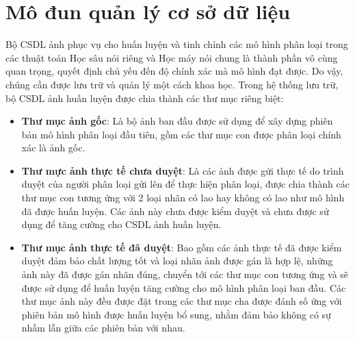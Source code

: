 \section{Mô đun quản lý cơ sở dữ liệu}
Bộ CSDL ảnh phục vụ cho huấn luyện và tinh chỉnh các mô hình phân loại trong các thuật toán Học sâu nói riêng và Học máy nói chung là thành phần vô cùng quan trọng, quyết định chủ yếu đến độ chính xác mà mô hình đạt được. Do vậy, chúng cần được lưu trữ và quản lý một cách khoa học. Trong hệ thống lưu trữ, bộ CSDL ảnh huấn luyện được chia thành các thư mục riêng biệt:
\begin{itemize}
	\item {\bf Thư mục ảnh gốc}: Là bộ ảnh ban đầu được sử dụng để xây dựng phiên bản mô hình phân loại đầu tiên, gồm các thư mục con được phân loại chính xác là ảnh gốc.
	\item {\bf Thư mực ảnh thực tế chưa duyệt}: Là các ảnh được gửi thực tế do trình duyệt của người phân loại gửi lên để thực hiện phân loại, được chia thành các thư mục con tương ứng với 2 loại nhãn có lao hay không có lao như mô hình đã được huấn luyện. Các ảnh này chưa được kiểm duyệt và chưa được sử dụng để tăng cường cho CSDL ảnh huấn luyện.
	\item {\bf Thư mục ảnh thực tế đã duyệt}: Bao gồm các ảnh thực tế đã được kiểm duyệt đảm bảo chất lượng tốt và loại nhãn ảnh được gán là hợp lệ, những ảnh này đã được gán nhãn đúng, chuyển tới các thư mục con tương ứng và sẽ được sử dụng để huấn luyện tăng cường cho mô hình phân loại ban đầu. Các thư mục ảnh này đều được đặt trong các thư mục cha được đánh số ứng với phiên bản mô hình được huấn luyện bổ sung, nhằm đảm bảo không có sự nhầm lẫn giữa các phiên bản với nhau.
\end{itemize}

